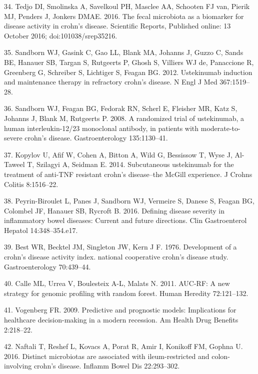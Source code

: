\documentclass[12pt,]{article}
\begin{document}
\hypertarget{ref-tedjo_CDactivity_2016}{}
34. Tedjo DI, Smolinska A, Savelkoul PH, Masclee AA, Schooten FJ van,
Pierik MJ, Penders J, Jonkers DMAE. 2016. The fecal microbiota as a
biomarker for disease activity in crohn's disease. Scientific Reports,
Published online: 13 October 2016; doi:101038/srep35216.

\hypertarget{ref-sandborn_ust_2012}{}
35. Sandborn WJ, Gasink C, Gao LL, Blank MA, Johanns J, Guzzo C, Sands
BE, Hanauer SB, Targan S, Rutgeerts P, Ghosh S, Villiers WJ de,
Panaccione R, Greenberg G, Schreiber S, Lichtiger S, Feagan BG. 2012.
Ustekinumab induction and maintenance therapy in refractory crohn's
disease. N Engl J Med 367:1519--28.

\hypertarget{ref-sandborn_ust_2008}{}
36. Sandborn WJ, Feagan BG, Fedorak RN, Scherl E, Fleisher MR, Katz S,
Johanns J, Blank M, Rutgeerts P. 2008. A randomized trial of
ustekinumab, a human interleukin-12/23 monoclonal antibody, in patients
with moderate-to-severe crohn's disease. Gastroenterology 135:1130--41.

\hypertarget{ref-kopylov_ust_2014}{}
37. Kopylov U, Afif W, Cohen A, Bitton A, Wild G, Bessissow T, Wyse J,
Al-Taweel T, Szilagyi A, Seidman E. 2014. Subcutaneous ustekinumab for
the treatment of anti-TNF resistant crohn's disease--the McGill
experience. J Crohns Colitis 8:1516--22.

\hypertarget{ref-PB_CDAI_2016}{}
38. Peyrin-Biroulet L, Panes J, Sandborn WJ, Vermeire S, Danese S,
Feagan BG, Colombel JF, Hanauer SB, Rycroft B. 2016. Defining disease
severity in inflammatory bowel diseases: Current and future directions.
Clin Gastroenterol Hepatol 14:348--354.e17.

\hypertarget{ref-Best_CDAI_1976}{}
39. Best WR, Becktel JM, Singleton JW, Kern J F. 1976. Development of a
crohn's disease activity index. national cooperative crohn's disease
study. Gastroenterology 70:439--44.

\hypertarget{ref-calle_aucrf_2011}{}
40. Calle ML, Urrea V, Boulesteix A-L, Malats N. 2011. AUC-RF: A new
strategy for genomic profiling with random forest. Human Heredity
72:121--132.

\hypertarget{ref-Vogenberg_progmods_2009}{}
41. Vogenberg FR. 2009. Predictive and prognostic models: Implications
for healthcare decision-making in a modern recession. Am Health Drug
Benefits 2:218--22.

\hypertarget{ref-naftali_tissinvol_2016}{}
42. Naftali T, Reshef L, Kovacs A, Porat R, Amir I, Konikoff FM, Gophna
U. 2016. Distinct microbiotas are associated with ileum-restricted and
colon-involving crohn's disease. Inflamm Bowel Dis 22:293--302.
\end{document}
